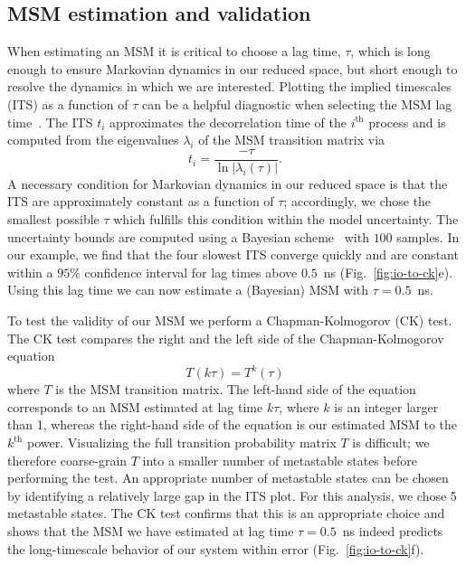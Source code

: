 \documentclass[9pt,tutorial]{livecoms}
\begin{document}
\subsection{MSM estimation and validation}
When estimating an MSM it is critical to choose a lag time, $\tau$, which is long enough to ensure Markovian dynamics in our reduced space, but short enough to resolve the dynamics in which we are interested.
Plotting the implied timescales (ITS) as a function of $\tau$ can be a helpful diagnostic when selecting the MSM lag time~\cite{swope-its}. The ITS $t_i$ approximates the decorrelation time of the $i^\textrm{th}$ process and is computed from the eigenvalues $\lambda_i$ of the MSM transition matrix via
\begin{equation}
\label{eq:its}
t_i = \frac{-\tau}{\ln\left|\lambda_i(\tau)\right|}.
\end{equation}
A necessary condition for Markovian dynamics in our reduced space is that the ITS are approximately constant as a function of $\tau$; accordingly, we chose the smallest possible $\tau$ which fulfills this condition within the model uncertainty. The uncertainty bounds are computed using a Bayesian scheme~\cite{ben-rev-msm,noe-tmat-sampling} with $100$ samples.
In our example, we find that the four slowest ITS converge quickly and are constant within a $95\%$ confidence interval for lag times above $0.5$~ns (Fig.~\ref{fig:io-to-ck}e). Using this lag time we can now estimate a (Bayesian) MSM with $\tau=0.5$~ns. 

To test the validity of our MSM we perform a Chapman-Kolmogorov (CK) test. The CK test compares the right and the left side of the Chapman-Kolmogorov equation
\begin{equation}
\label{eq:ck}
T(k \tau) = T^k(\tau)
\end{equation}
where $T$ is the MSM transition matrix. The left-hand side of the equation corresponds to an MSM estimated at lag time $k\tau$, where $k$ is an integer larger than 1, whereas the right-hand side of the equation is our estimated MSM to the $k^\textrm{th}$ power.
Visualizing the full transition probability matrix $T$ is difficult; we therefore coarse-grain $T$ into a smaller number of metastable states before performing the test.
An appropriate number of metastable states can be chosen by identifying a relatively large gap in the ITS plot.
For this analysis, we chose 5 metastable states.
The CK test confirms that this is an appropriate choice and shows that the MSM we have estimated at lag time $\tau=0.5$~ns indeed predicts the long-timescale behavior of our system within error (Fig.~\ref{fig:io-to-ck}f).
\end{document}
